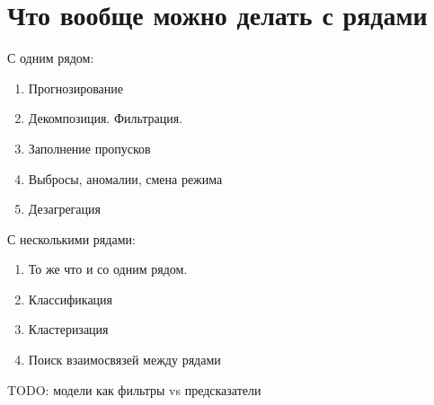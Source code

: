 \section{Что вообще можно делать с рядами}

С одним рядом:

\begin{enumerate}
  \item Прогнозирование
  \item Декомпозиция. Фильтрация.
  \item Заполнение пропусков
  \item Выбросы, аномалии, смена режима
  \item Дезагрегация
\end{enumerate}

С несколькими рядами:

\begin{enumerate}
  \item То же что и со одним рядом.
  \item Классификация
  \item Кластеризация
  \item Поиск взаимосвязей между рядами
\end{enumerate}

TODO: модели как фильтры vs предсказатели